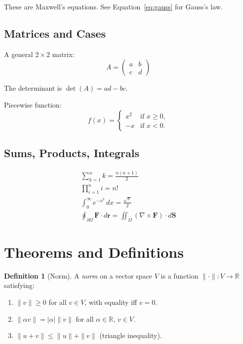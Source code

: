 \documentclass[12pt,a4paper]{article}
\theoremstyle{definition}
\newtheorem{definition}{Definition}[section]
\begin{document}
These are Maxwell's equations. See Equation~\eqref{eq:gauss} for Gauss's law.

\subsection{Matrices and Cases}

A general $2 \times 2$ matrix:
\[
	A = \begin{pmatrix}
		a & b \\
		c & d
	\end{pmatrix}
\]

The determinant is $\det(A) = ad - bc$.

Piecewise function:
\[
	f(x) = \begin{cases}
		x^2 & \text{if } x \geq 0, \\
		-x  & \text{if } x < 0.
	\end{cases}
\]

\subsection{Sums, Products, Integrals}

\begin{gather}
	\sum_{k=1}^{n} k = \frac{n(n+1)}{2} \\
	\prod_{i=1}^{n} i = n! \\
	\int_0^\infty e^{-x^2} \, dx = \frac{\sqrt{\pi}}{2} \\
	\oint_{\partial \Omega} \mathbf{F} \cdot d\mathbf{r} = \iint_\Omega (\nabla \times \mathbf{F}) \cdot d\mathbf{S}
\end{gather}

\section{Theorems and Definitions}

\begin{definition}[Norm]
	A \emph{norm} on a vector space $V$ is a function $\|\cdot\|: V \to \mathbb{R}$
	satisfying:
	\begin{enumerate}[label=(\roman*)]
		\item $\|v\| \geq 0$ for all $v \in V$, with equality iff $v = 0$.
		\item $\|\alpha v\| = |\alpha| \|v\|$ for all $\alpha \in \mathbb{R}$, $v \in V$.
		\item $\|u + v\| \leq \|u\| + \|v\|$ (triangle inequality).
	\end{enumerate}
\end{definition}
\end{document}
